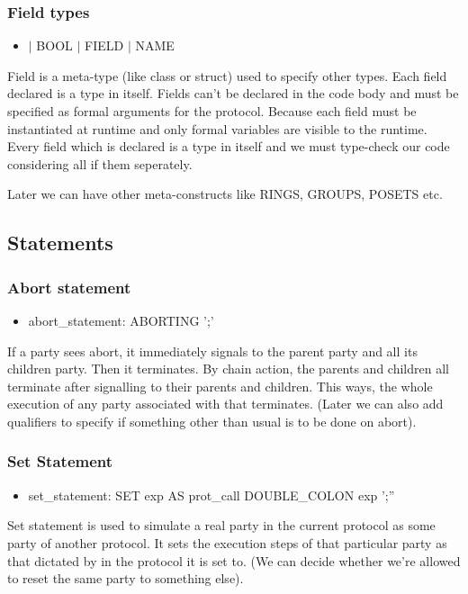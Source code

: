 \documentclass{article}
\begin{document}
\subsubsection{Field types}
\begin{itemize}
\item $|$ BOOL $|$ FIELD $|$ NAME
\end{itemize}
Field is a meta-type (like class or struct) used to specify other types. Each field declared is a type in itself. Fields can't be declared in the code body and must be specified as formal arguments for the protocol. Because each field must be instantiated at runtime and only formal variables are visible to the runtime. Every field which is declared is a type in itself and we must type-check our code considering all if them seperately.

Later we can have other meta-constructs like RINGS, GROUPS, POSETS etc.

\subsection{Statements}

\subsubsection{Abort statement}
\begin{itemize}
\item abort\_statement: ABORTING ';'
\end{itemize}

If a party sees abort, it immediately signals to the parent party and all its children party. Then it terminates. By chain action, the parents and children all terminate after signalling to their parents and children. This ways, the whole execution of any party associated with that terminates. (Later we can also add qualifiers to specify if something other than usual is to be done on abort).

\subsubsection{Set Statement}
\begin{itemize}
\item set\_statement: SET exp AS prot\_call DOUBLE\_COLON exp ';''
\end{itemize}

Set statement is used to simulate a real party in the current protocol as some party of another protocol. It sets the execution steps of that particular party as that dictated by in the protocol it is set to. (We can decide whether we're allowed to reset the same party to something else).
\end{document}
